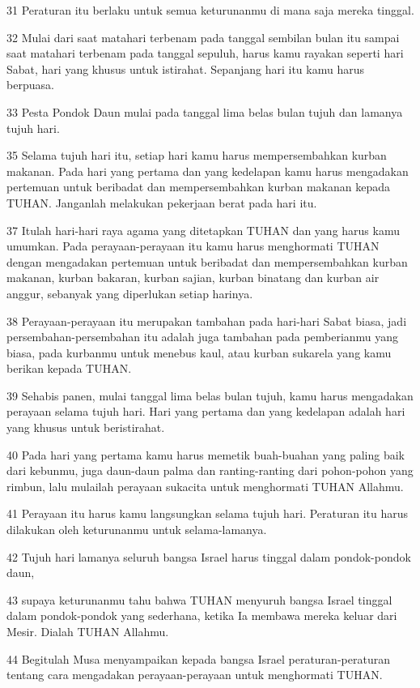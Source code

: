 \par 31 Peraturan itu berlaku untuk semua keturunanmu di mana saja mereka tinggal.
\par 32 Mulai dari saat matahari terbenam pada tanggal sembilan bulan itu sampai saat matahari terbenam pada tanggal sepuluh, harus kamu rayakan seperti hari Sabat, hari yang khusus untuk istirahat. Sepanjang hari itu kamu harus berpuasa.
\par 33 Pesta Pondok Daun mulai pada tanggal lima belas bulan tujuh dan lamanya tujuh hari.
\par 35 Selama tujuh hari itu, setiap hari kamu harus mempersembahkan kurban makanan. Pada hari yang pertama dan yang kedelapan kamu harus mengadakan pertemuan untuk beribadat dan mempersembahkan kurban makanan kepada TUHAN. Janganlah melakukan pekerjaan berat pada hari itu.
\par 37 Itulah hari-hari raya agama yang ditetapkan TUHAN dan yang harus kamu umumkan. Pada perayaan-perayaan itu kamu harus menghormati TUHAN dengan mengadakan pertemuan untuk beribadat dan mempersembahkan kurban makanan, kurban bakaran, kurban sajian, kurban binatang dan kurban air anggur, sebanyak yang diperlukan setiap harinya.
\par 38 Perayaan-perayaan itu merupakan tambahan pada hari-hari Sabat biasa, jadi persembahan-persembahan itu adalah juga tambahan pada pemberianmu yang biasa, pada kurbanmu untuk menebus kaul, atau kurban sukarela yang kamu berikan kepada TUHAN.
\par 39 Sehabis panen, mulai tanggal lima belas bulan tujuh, kamu harus mengadakan perayaan selama tujuh hari. Hari yang pertama dan yang kedelapan adalah hari yang khusus untuk beristirahat.
\par 40 Pada hari yang pertama kamu harus memetik buah-buahan yang paling baik dari kebunmu, juga daun-daun palma dan ranting-ranting dari pohon-pohon yang rimbun, lalu mulailah perayaan sukacita untuk menghormati TUHAN Allahmu.
\par 41 Perayaan itu harus kamu langsungkan selama tujuh hari. Peraturan itu harus dilakukan oleh keturunanmu untuk selama-lamanya.
\par 42 Tujuh hari lamanya seluruh bangsa Israel harus tinggal dalam pondok-pondok daun,
\par 43 supaya keturunanmu tahu bahwa TUHAN menyuruh bangsa Israel tinggal dalam pondok-pondok yang sederhana, ketika Ia membawa mereka keluar dari Mesir. Dialah TUHAN Allahmu.
\par 44 Begitulah Musa menyampaikan kepada bangsa Israel peraturan-peraturan tentang cara mengadakan perayaan-perayaan untuk menghormati TUHAN.

